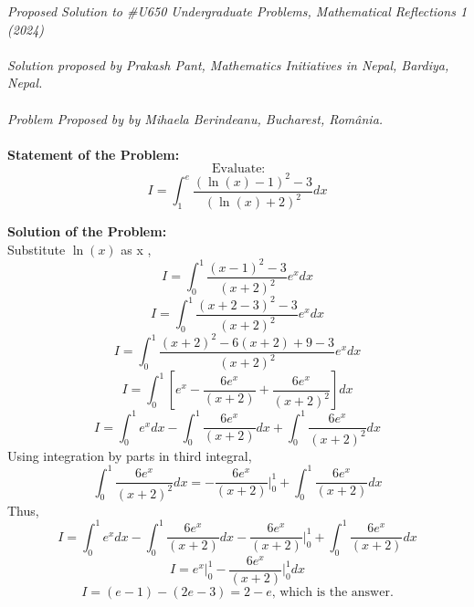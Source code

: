 \documentclass[12pt]{article}
\begin{document}
\textit{Proposed Solution to \#U650 Undergraduate Problems, Mathematical Reflections 1 (2024) }\\ \\
\textit{Solution proposed by Prakash Pant, Mathematics Initiatives in Nepal, Bardiya, Nepal.}\\ \\
\textit{Problem Proposed by  by Mihaela Berindeanu, Bucharest, România.} \\ \\
\textbf{Statement of the Problem:}
\[ \text{ Evaluate} : \]
\[ I = \int_1^e \frac{(\ln(x)-1)^2-3}{(\ln(x)+2)^2} dx\]

\textbf{Solution of the Problem:} \\
Substitute $ \ln(x)$ as x , 
\[ I = \int_0^1 \frac{(x-1)^2-3}{(x+2)^2} e^x dx\]
\[ I = \int_0^1 \frac{(x+2-3)^2-3}{(x+2)^2} e^x dx\]
\[ I = \int_0^1 \frac{(x+2)^2-6(x+2)+9-3}{(x+2)^2} e^x dx\]
\[ I = \int_0^1 \left[ e^x - \frac{6 e^x}{(x+2)} + \frac{6 e^x}{(x+2)^2} \right] dx \]
\[ I = \int_0^1  e^x dx - \int_0^1  \frac{6 e^x}{(x+2)} dx +\int_0^1 \frac{6 e^x}{(x+2)^2}  dx \]
Using integration by parts in third integral,
\[\int_0^1 \frac{6 e^x}{(x+2)^2}  dx =  -  \frac{6e^x}{(x+2)}\Big|_0^1 +  \int_0^1 \frac{6 e^x}{(x+2)}  dx \]
Thus, 
\[ I = \int_0^1  e^x dx - \int_0^1  \frac{6 e^x}{(x+2)} dx -  \frac{6e^x}{(x+2)}\Big|_0^1 +  \int_0^1 \frac{6 e^x}{(x+2)}    dx \]
\[ I =  e^x \Big|_0^1  -  \frac{6e^x}{(x+2)}\Big|_0^1     dx \]
\[ I =  (e-1)  -  (2e-3)   = 2-e  \text{, which is the answer.} \]
\end{document}

